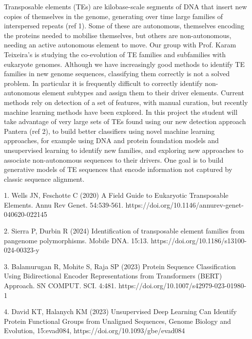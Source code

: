 \documentclass[12pt]{article}
\begin{document}
Transposable elements (TEs) are kilobase-scale segments of DNA that insert new copies of themselves in the genome, generating over time large families of interspersed repeats (ref 1). Some of these are autonomous, themselves encoding the proteins needed to mobilise themselves, but others are non-autonomous, needing an active autonomous element to move. Our group with Prof. Karam Teixeira’s is studying the co-evolution of TE families and subfamilies with eukaryote genomes. Although we have increasingly good methods to identify TE families in new genome sequences, classifying them correctly is not a solved problem. In particular it is frequently difficult to correctly identify non-autonomous element subtypes and assign them to their driver elements. Current methods rely on detection of a set of features, with manual curation, but recently machine learning methods have been explored. In this project the student will take advantage of very large sets of TEs found using our new detection approach Pantera (ref 2), to build better classifiers using novel machine learning approaches, for example using DNA and protein foundation models and unsupervised learning to identify new families, and exploring new approaches to associate non-autonomous sequences to their drivers. One goal is to build generative models of TE sequences that encode information not captured by classic sequence alignment.

1. Wells JN, Feschotte C (2020) A Field Guide to Eukaryotic Transposable Elements. Annu Rev Genet. 54:539-561. https://doi.org/10.1146/annurev-genet-040620-022145 

2. Sierra P, Durbin R (2024) Identification of transposable element families from pangenome polymorphisms. Mobile DNA. 15:13. https://doi.org/10.1186/s13100-024-00323-y 

3. Balamurugan R, Mohite S, Raja SP (2023) Protein Sequence Classification Using Bidirectional Encoder Representations from Transformers (BERT) Approach. SN COMPUT. SCI. 4:481. https://doi.org/10.1007/s42979-023-01980-1 

4. David KT, Halanych KM (2023) Unsupervised Deep Learning Can Identify Protein Functional Groups from Unaligned Sequences, Genome Biology and Evolution, 15:evad084, https://doi.org/10.1093/gbe/evad084 

\fi

\iffalse

\end{document}
